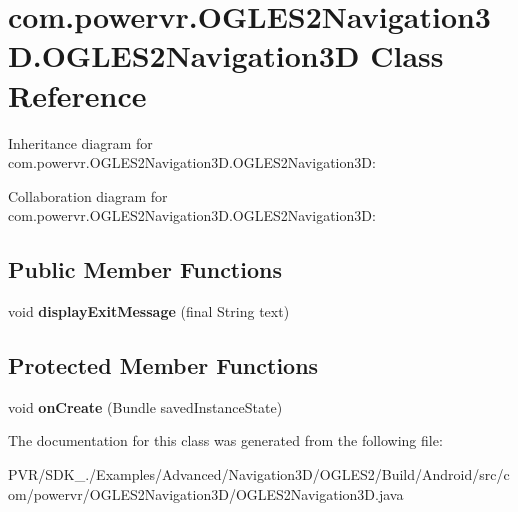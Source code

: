 \hypertarget{classcom_1_1powervr_1_1_o_g_l_e_s2_navigation3_d_1_1_o_g_l_e_s2_navigation3_d}{\section{com.\+powervr.\+O\+G\+L\+E\+S2\+Navigation3\+D.\+O\+G\+L\+E\+S2\+Navigation3\+D Class Reference}
\label{classcom_1_1powervr_1_1_o_g_l_e_s2_navigation3_d_1_1_o_g_l_e_s2_navigation3_d}
}


Inheritance diagram for com.\+powervr.\+O\+G\+L\+E\+S2\+Navigation3\+D.\+O\+G\+L\+E\+S2\+Navigation3\+D\+:


Collaboration diagram for com.\+powervr.\+O\+G\+L\+E\+S2\+Navigation3\+D.\+O\+G\+L\+E\+S2\+Navigation3\+D\+:
\subsection*{Public Member Functions}
\begin{DoxyCompactItemize}
\item 
\hypertarget{classcom_1_1powervr_1_1_o_g_l_e_s2_navigation3_d_1_1_o_g_l_e_s2_navigation3_d_abea8cf1187547aa02c6579403035ff61}{void {\bfseries display\+Exit\+Message} (final String text)}\label{classcom_1_1powervr_1_1_o_g_l_e_s2_navigation3_d_1_1_o_g_l_e_s2_navigation3_d_abea8cf1187547aa02c6579403035ff61}

\end{DoxyCompactItemize}
\subsection*{Protected Member Functions}
\begin{DoxyCompactItemize}
\item 
\hypertarget{classcom_1_1powervr_1_1_o_g_l_e_s2_navigation3_d_1_1_o_g_l_e_s2_navigation3_d_ad6bdf498fb378dcc9499b930b7a6404b}{void {\bfseries on\+Create} (Bundle saved\+Instance\+State)}\label{classcom_1_1powervr_1_1_o_g_l_e_s2_navigation3_d_1_1_o_g_l_e_s2_navigation3_d_ad6bdf498fb378dcc9499b930b7a6404b}

\end{DoxyCompactItemize}


The documentation for this class was generated from the following file\+:\begin{DoxyCompactItemize}
\item 
P\+V\+R/\+S\+D\+K\+\_./\+Examples/\+Advanced/\+Navigation3\+D/\+O\+G\+L\+E\+S2/\+Build/\+Android/src/com/powervr/\+O\+G\+L\+E\+S2\+Navigation3\+D/O\+G\+L\+E\+S2\+Navigation3\+D.\+java\end{DoxyCompactItemize}
